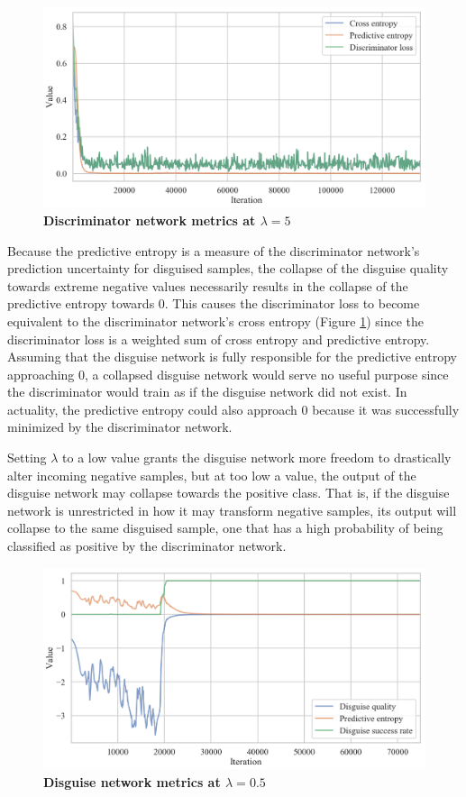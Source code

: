 \documentclass{proc}
\begin{document}
\begin{figure}[h!]
		\includegraphics*[scale=0.23]{../figures/neg-collapse-2.png}
		\caption{\textbf{Discriminator network metrics at $\lambda = 5$}}
		\label{fig:neg-collapse-2}
\end{figure}

Because the predictive entropy is a measure of the discriminator network's prediction uncertainty for disguised samples, the collapse of the disguise quality towards extreme negative values necessarily results in the collapse of the predictive entropy towards $0$. This causes the discriminator loss to become equivalent to the discriminator network's cross entropy (Figure \ref{fig:neg-collapse-2}) since the discriminator loss is a weighted sum of cross entropy and predictive entropy. Assuming that the disguise network is fully responsible for the predictive entropy approaching $0$, a collapsed disguise network would serve no useful purpose since the discriminator would train as if the disguise network did not exist. In actuality, the predictive entropy could also approach $0$ because it was successfully minimized by the discriminator network.

Setting $\lambda$ to a low value grants the disguise network more freedom to drastically alter incoming negative samples, but at too low a value, the output of the disguise network may collapse towards the positive class. That is, if the disguise network is unrestricted in how it may transform negative samples, its output will collapse to the same disguised sample, one that has a high probability of being classified as positive by the discriminator network.

\begin{figure}[h!]
		\includegraphics*[scale=0.23]{../figures/pos-collapse-1.png}
		\caption{\textbf{Disguise network metrics at $\lambda = 0.5$}}
		\label{fig:pos-collapse-1}
\end{figure}
\end{document}
